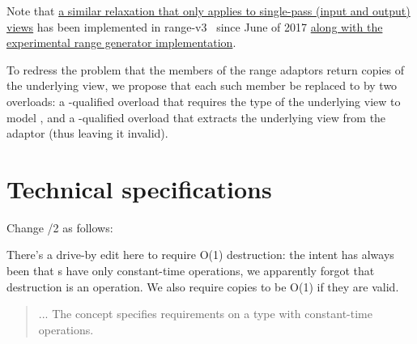 Note that
\href{https://github.com/ericniebler/range-v3/commit/11fb1f0c6ef60a61a3eb264b5c3d0d42fc4615a2}{
a similar relaxation that only applies to single-pass (input and output) views}
has been implemented in range-v3~\cite{range-v3} since June of 2017
\href{https://github.com/ericniebler/range-v3/commit/d2bd910faa75d9016f6fb124f9de46c926c49c72}{
along with the experimental range generator implementation}.

To redress the problem that the  members of the range adaptors
return copies of the underlying view, we propose that each such 
member be replaced to by two overloads: a -qualified overload that
requires the type of the underlying view to model , and
a \tcode{\&\&}-qualified overload that extracts the underlying view from the
adaptor (thus leaving it invalid).


\chapter{Technical specifications}
Change /2 as follows:
\begin{note}
There's a drive-by
edit here to require O(1) destruction: the intent has always been that
s have only constant-time operations, we apparently forgot that
destruction is an operation. We also require copies to be O(1) if they are valid.
\end{note}
\begin{quote}
... The  concept specifies requirements on a  type with
constant-time   operations.
\end{quote}

